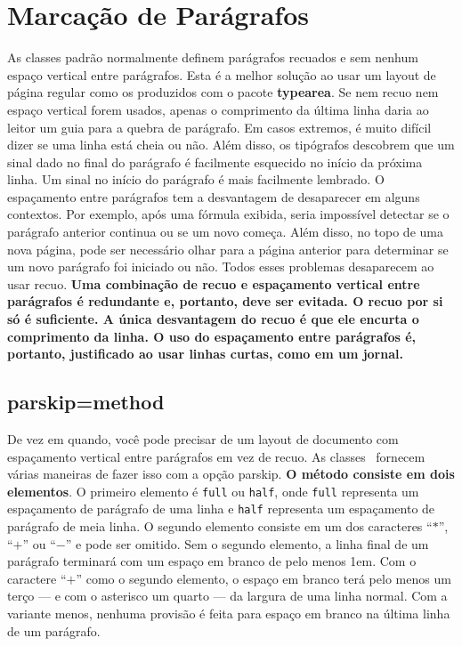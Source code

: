 \chapter{Marcação de Parágrafos}
As classes padrão normalmente definem parágrafos recuados e sem nenhum espaço vertical entre parágrafos. Esta é a melhor solução ao usar um layout de página regular como os produzidos com o pacote \textbf{typearea}. Se nem recuo nem espaço vertical forem usados, apenas o comprimento da última linha daria ao leitor um guia para a quebra de parágrafo. Em casos extremos, é muito difícil dizer se uma linha está cheia ou não. Além disso, os tipógrafos descobrem que um sinal dado no final do parágrafo é facilmente esquecido no início da próxima linha. Um sinal no início do parágrafo é mais facilmente lembrado. O espaçamento entre parágrafos tem a desvantagem de desaparecer em alguns contextos. Por exemplo, após uma fórmula exibida, seria impossível detectar se o parágrafo anterior continua ou se um novo começa. Além disso, no topo de uma nova página, pode ser necessário olhar para a página anterior para determinar se um novo parágrafo foi iniciado ou não. Todos esses problemas desaparecem ao usar recuo. \textbf{Uma combinação de recuo e espaçamento vertical entre parágrafos é redundante e, portanto, deve ser evitada. O recuo por si só é suficiente. A única desvantagem do recuo é que ele encurta o comprimento da linha. O uso do espaçamento entre parágrafos é, portanto, justificado ao usar linhas curtas, como em um jornal.}

\section{parskip=method}
De vez em quando, você pode precisar de um layout de documento com espaçamento vertical entre parágrafos em vez de recuo. As classes \KOMAScript\ fornecem várias maneiras de fazer isso com a opção parskip. \textbf{O método consiste em dois elementos}. O primeiro elemento é \texttt{full} ou \texttt{half}, onde \texttt{full} representa um espaçamento de parágrafo de uma linha e \texttt{half} representa um espaçamento de parágrafo de meia linha. O segundo elemento consiste em um dos caracteres ``$\ast$'', ``$+$'' ou ``$-$'' e pode ser omitido. Sem o segundo elemento, a linha final de um parágrafo terminará com um espaço em branco de pelo menos 1em. Com o caractere ``$+$'' como o segundo elemento, o espaço em branco terá pelo menos um terço --- e com o asterisco um quarto --- da largura de uma linha normal. Com a variante menos, nenhuma provisão é feita para espaço em branco na última linha de um parágrafo.

